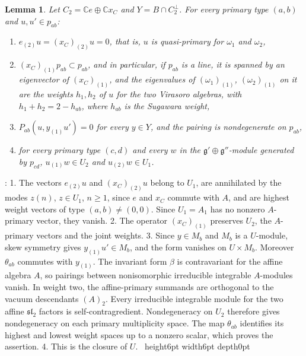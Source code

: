 \documentclass[leqno]{article}
\newcommand{\Cbb}{\ensuremath{\mathbb{C}}}
\renewcommand{\geq}{\ensuremath{\geqslant}}
\newcommand{\qed}{\hfill \vrule height6pt  width6pt depth0pt}
\newtheorem{lemma}[thm]{Lemma}
\newenvironment{proof}[1][]{\noindent {\it Proof #1} : }{\hbox{~}\qed
\smallskip
}
\numberwithin{equation}{section}
\begin{document}
\begin{lemma}
\label{lem:line-conditions}
Let $C_2 = \Cbb e \oplus \Cbb x_C$ and $Y = B \cap C_2^\perp$. For every primary type $(a,b)$ and $u,u' \in p_{ab}$:
\begin{enumerate}
\item $e_{(2)}u = (x_C)_{(2)}u = 0$, that is, $u$ is quasi-primary for $\omega_1$ and $\omega_2$,
\item $(x_C)_{(1)}p_{ab} \subset p_{ab}$, and in particular, if $p_{ab}$ is a line, it is spanned by an eigenvector of $(x_C)_{(1)}$, and the eigenvalues of $(\omega_1)_{(1)}$, $(\omega_2)_{(1)}$ on it are the weights $h_1, h_2$ of $u$ for the two Virasoro algebras, with $h_1+h_2 = 2-h_{ab}$, where $h_{ab}$ is the Sugawara weight,
\item $P_{ab}(u,y_{(1)}u') = 0$ for every $y \in Y$, and the pairing is nondegenerate on $p_{ab}$,
\item for every primary type $(c,d)$ and every $w$ in the $\mathfrak g' \oplus \mathfrak g''$-module generated by $p_{cd}$, $u_{(1)}w \in U_2$ and $u_{(2)}w \in U_1$.
\end{enumerate}
\end{lemma}

\begin{proof}
1. The vectors $e_{(2)}u$ and $(x_C)_{(2)}u$ belong to $U_1$, are annihilated by the modes $z(n)$, $z \in U_1$, $n \geq 1$, since $e$ and $x_C$ commute with $A$, and are highest weight vectors of type $(a,b) \neq (0,0)$. Since $U_1 = A_1$ has no nonzero $A$-primary vector, they vanish. 2. The operator $(x_C)_{(1)}$ preserves $U_2$, the $A$-primary vectors and the joint weights. 3. Since $y \in M_b$ and $M_b$ is a $U$-module, skew symmetry gives $y_{(1)}u' \in M_b$, and the form vanishes on $U \times M_b$. Moreover $\theta_{ab}$ commutes with $y_{(1)}$. The invariant form $\beta$ is contravariant for the affine algebra $A$, so pairings between nonisomorphic irreducible integrable $A$-modules vanish. In weight two, the affine-primary summands are orthogonal to the vacuum descendants $(A)_2$. Every irreducible integrable module for the two affine $\mathfrak{sl}_2$ factors is self-contragredient. Nondegeneracy on $U_2$ therefore gives nondegeneracy on each primary multiplicity space. The map $\theta_{ab}$ identifies its highest and lowest weight spaces up to a nonzero scalar, which proves the assertion. 4. This is the closure of $U$.
\end{proof}

\end{document}
